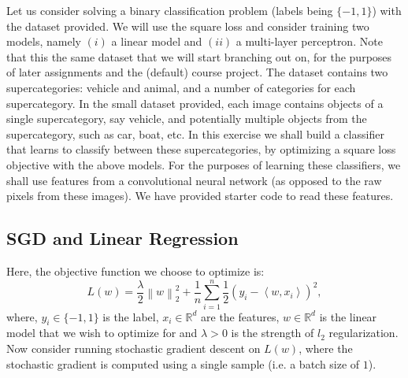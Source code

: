 \documentclass[letterpaper,11pt]{article}
\begin{document}
Let us consider solving a binary classification problem (labels being
$\{-1, 1\}$) with the dataset provided. We will use the square loss and consider
training two models, namely $(i)$ a linear model and $(ii)$ a multi-layer
perceptron. Note that this the same dataset that we will start branching out on,
for the purposes of later assignments and the (default) course project.  The
dataset contains two supercategories: vehicle and animal, and a number of
categories for each supercategory. In the small dataset provided, each image
contains objects of a single supercategory, say vehicle, and potentially
multiple objects from the supercategory, such as car, boat, etc. In this
exercise we shall build a classifier that learns to classify between these
supercategories, by optimizing a square loss objective with the above
models. For the purposes of learning these classifiers, we shall use features
from a convolutional neural network (as opposed to the raw pixels from these
images). We have provided starter code to read these features.

\subsection*{SGD and Linear Regression}

Here, the objective function we choose to optimize is:
\begin{equation}
  L(w) = \frac{\lambda}{2}\left\lVert w \right\rVert_2^2  + \frac{1}{n}\sum_{i=1}^n\frac{1}{2}\left(y_i - \left\langle w, x_i\right\rangle\right)^2,
\end{equation}
where, $y_i \in \{-1, 1\}$ is the label, $x_i \in \mathbb{R}^d$ are the
features, $w \in \mathbb{R}^d$ is the linear model that we wish to optimize for
and $\lambda > 0$ is the strength of $l_2$ regularization. Now consider running
stochastic gradient descent on $L(w)$, where the stochastic gradient is computed
using a single sample (i.e. a batch size of $1$).
\end{document}
